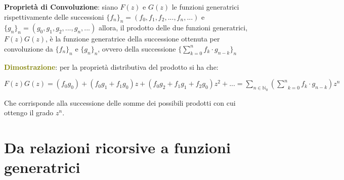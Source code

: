 \begin{flushleft}
    \textbf{Proprietà di Convoluzione}: siano $F(z)$ e $G(z)$ le funzioni generatrici rispettivamente delle successioni $\{f_n\}_n = (f_0, f_1, f_2, ..., f_n, ...)$ e $\{g_n\}_n = (g_0, g_1, g_2, ..., g_n, ...)$ allora, il prodotto delle due funzioni generatrici, $F(z)G(z)$, è la funzione generatrice della successione ottenuta per convoluzione da $\{f_n\}_n$ e $\{g_n\}_n$, ovvero della successione $\{\sum_{k=0}^n f_k \cdot g_{n-k}\}_n$
    
    \begin{boxA}
        \textcolor{olive}{\textbf{Dimostrazione}}: per la proprietà distributiva del prodotto si ha che:

        {\centering
            $F(z)G(z) = (f_0g_0) + (f_0g_1 + f_1g_0)z + (f_0g_2 + f_1g_1 + f_2g_0)z^2 + ... = \underset{n \in \mathbb{N}_0}{\sum} (\underset{k=0}{\overset{n}{\sum}} f_k \cdot g_{n-k})z^n$
        \par}
    \end{boxA}
    Che corrisponde alla successione delle somme dei possibili prodotti con cui ottengo il grado $z^n$.
\end{flushleft}

\newpage
\section{Da relazioni ricorsive a funzioni generatrici}

